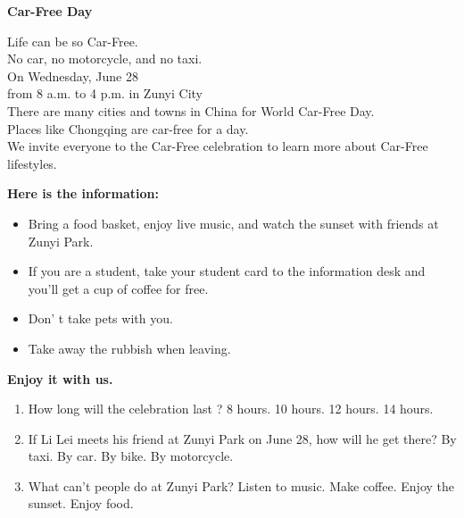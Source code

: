 \documentclass{ExamJHSEngl}
\begin{document}
\begin{framed}   

\centerline{\textbf{Car-Free Day}}
\begin{tightcenter}
Life can be so Car-Free.\\
No car, no motorcycle, and no taxi.\\
On Wednesday, June 28\\
from 8 a.m. to 4 p.m. in Zunyi City\\
There are many cities and towns in China for World Car-Free Day.\\
Places like Chongqing are car-free for a day.\\
We invite everyone to the Car-Free celebration to learn more about Car-Free lifestyles.\\ 
\end{tightcenter}
\centerline{\textbf{ Here is the information: }}
\begin{itemize}
  \item Bring a food basket, enjoy live music, and watch the sunset with friends at Zunyi Park.
  \item If you are a student, take your student card to the information desk and you'll get a cup of coffee for free.
  \item Don' t take pets with you.
  \item Take away the rubbish when leaving.
\end{itemize}

\centerline{\textbf{ Enjoy it with us. }}
\end{framed}

\begin{enumerate}[resume,ref={\arabic*},labelsep=-0.1em]

  \item[\choice{A}] How long will the celebration last ?
  \options
    {8 hours.}
    {10 hours.}
    {12 hours.}
    {14 hours.}

  \item[\choice{C}] If Li Lei meets his friend at Zunyi Park on June 28, how will he get there?
  \options
    {By taxi.}
    {By car.}
    {By bike.}
    {By motorcycle.}

  \item[\choice{B}] What can't people do at Zunyi Park?
  \options
    {Listen to music.}
    {Make coffee.}
    {Enjoy the sunset.}
    {Enjoy food.}

\end{enumerate}


\end{document}
